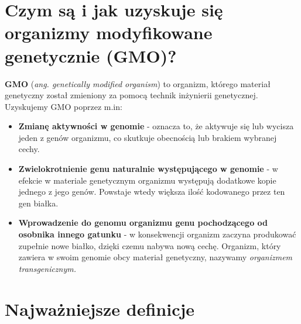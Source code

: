 \documentclass[a4paper, twocolumn]{article}
\begin{document}
\section{Czym są i jak uzyskuje się organizmy modyfikowane genetycznie (GMO)?}%
\label{sec:Czym są i jak uzyskuje się organizmy modyfikowane genetycznie (GMO)?}
\textbf{GMO} (\textit{ang. genetically modified organism}) to organizm, którego materiał genetyczny został zmieniony za pomocą technik inżynierii genetycznej. \\
Uzyskujemy GMO poprzez m.in:
\begin{itemize}
	\item \textbf{Zmianę aktywności w genomie} - oznacza to, że aktywuje się lub wycisza jeden z genów organizmu, co skutkuje obecnością lub brakiem wybranej cechy.
	\item \textbf{Zwielokrotnienie genu naturalnie występującego w genomie} - w efekcie w materiale genetycznym organizmu występują dodatkowe kopie jednego z jego genów.
	Powstaje wtedy większa ilość kodowanego przez ten gen białka.
	\item \textbf{Wprowadzenie do genomu organizmu genu pochodzącego od osobnika innego gatunku} - w konsekwencji organizm zaczyna produkować zupełnie nowe białko, dzięki czemu nabywa nową cechę.
	Organizm, który zawiera w swoim genomie obcy materiał genetyczny, nazywamy \textit{organizmem transgenicznym.}
\end{itemize}
\appendix
\section{Najważniejsze definicje}%
\label{sec:Najważniejsze definicje}

\tableofcontents
\end{document}
